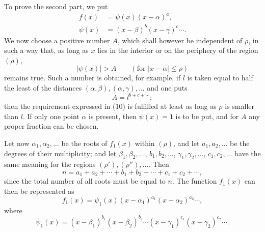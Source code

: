 \documentclass[11pt]{article}
\begin{document}
To prove the second part, we put
\begin{align}
 f(x)&=\psi(x)(x-\alpha)^a,
\tag{8}\\
 \psi(x)&=(x-\beta)^b(x-\gamma)^c\cdots .
\tag{9}
\end{align}
We now choose a positive number $A$, which shall however be independent of $\rho$, in such a way that, as long as $x$ lies in the interior or on the periphery of the region $(\rho)$,
\begin{equation}
 |\psi(x)|>A \qquad (\text{for } |x-\alpha|\le \rho)
\tag{10}
\end{equation}
remains true. Such a number is obtained, for example, if $l$ is taken equal to half the least of the distances $(\alpha,\beta),(\alpha,\gamma),\ldots$ and one puts
\[
 A=l^{b+c+\cdots};
\]
then the requirement expressed in (10) is fulfilled at least as long as $\rho$ is smaller than $l$. If only one point $\alpha$ is present, then $\psi(x)=1$ is to be put, and for $A$ any proper fraction can be chosen.

Let now $\alpha_1,\alpha_2,
\ldots$ be the roots of $f_1(x)$ within $(\rho)$, and let $a_1,a_2,
\ldots$ be the degrees of their multiplicity; and let $\beta_1,\beta_2,
\ldots$, $b_1,b_2,
\ldots$, $\gamma_1,\gamma_2,
\ldots$, $c_1,c_2,
\ldots$ have the same meaning for the regions $(\rho'),(\rho''),\ldots$. Then
\begin{equation}
 n=a_1+a_2+\cdots+b_1+b_2+\cdots+c_1+c_2+\cdots,
\tag{11}
\end{equation}
since the total number of all roots must be equal to $n$. The function $f_1(x)$ can then be represented as
\begin{equation}
 f_1(x)=\psi_1(x)(x-\alpha_1)^{a_1}(x-\alpha_2)^{a_2}\cdots,
\tag{12}
\end{equation}
where
\begin{equation}
 \psi_1(x)=(x-\beta_1)^{b_1}(x-\beta_2)^{b_2}\cdots
          (x-\gamma_1)^{c_1}(x-\gamma_2)^{c_2}\cdots .
\tag{13}
\end{equation}
\end{document}
